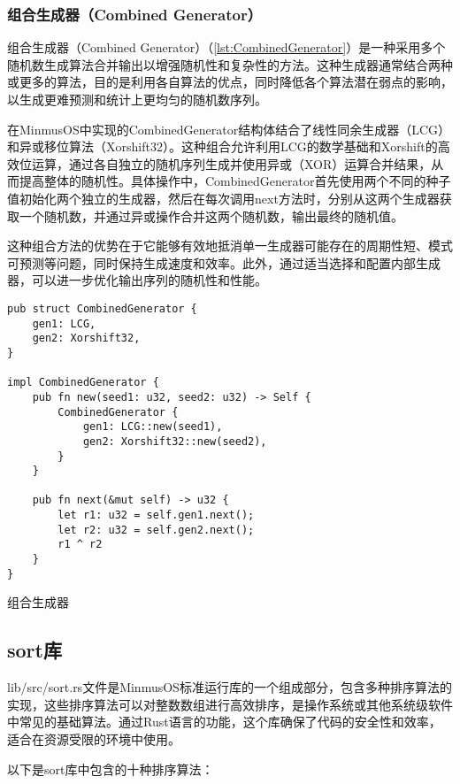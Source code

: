 \subsubsection{组合生成器（Combined Generator）}

组合生成器（Combined Generator）（\cref{lst:CombinedGenerator}）是一种采用多个随机数生成算法合并输出以增强随机性和复杂性的方法。这种生成器通常结合两种或更多的算法，目的是利用各自算法的优点，同时降低各个算法潜在弱点的影响，以生成更难预测和统计上更均匀的随机数序列。

在MinmusOS中实现的CombinedGenerator结构体结合了线性同余生成器（LCG）和异或移位算法（Xorshift32）。这种组合允许利用LCG的数学基础和Xorshift的高效位运算，通过各自独立的随机序列生成并使用异或（XOR）运算合并结果，从而提高整体的随机性。具体操作中，CombinedGenerator首先使用两个不同的种子值初始化两个独立的生成器，然后在每次调用next方法时，分别从这两个生成器获取一个随机数，并通过异或操作合并这两个随机数，输出最终的随机值。

这种组合方法的优势在于它能够有效地抵消单一生成器可能存在的周期性短、模式可预测等问题，同时保持生成速度和效率。此外，通过适当选择和配置内部生成器，可以进一步优化输出序列的随机性和性能。

\begin{listing}[htbp]
    \begin{verbatim}
pub struct CombinedGenerator {
    gen1: LCG,
    gen2: Xorshift32,
}

impl CombinedGenerator {
    pub fn new(seed1: u32, seed2: u32) -> Self {
        CombinedGenerator {
            gen1: LCG::new(seed1),
            gen2: Xorshift32::new(seed2),
        }
    }

    pub fn next(&mut self) -> u32 {
        let r1: u32 = self.gen1.next();
        let r2: u32 = self.gen2.next();
        r1 ^ r2
    }
}
    \end{verbatim}
    \caption{组合生成器}\label{lst:CombinedGenerator}
\end{listing}

\subsection{sort库}

lib/src/sort.rs文件是MinmusOS标准运行库的一个组成部分，包含多种排序算法的实现，这些排序算法可以对整数数组进行高效排序，是操作系统或其他系统级软件中常见的基础算法。通过Rust语言的功能，这个库确保了代码的安全性和效率，适合在资源受限的环境中使用。

以下是sort库中包含的十种排序算法：

